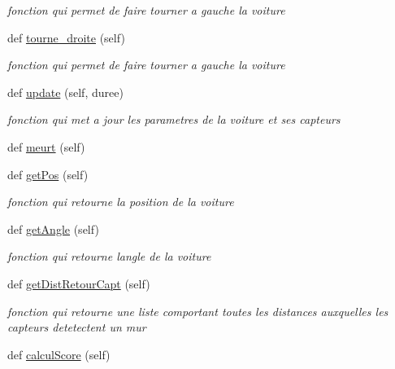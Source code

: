 \begin{DoxyCompactItemize}
\begin{DoxyCompactList}\small\item\em fonction qui permet de faire tourner a gauche la voiture \end{DoxyCompactList}\item 
def \hyperlink{classsrc_1_1_voiture_1_1voiture_1_1_voiture_ad32e5359e63f20d848ef161a6926a082}{tourne\+\_\+droite} (self)
\begin{DoxyCompactList}\small\item\em fonction qui permet de faire tourner a gauche la voiture \end{DoxyCompactList}\item 
def \hyperlink{classsrc_1_1_voiture_1_1voiture_1_1_voiture_aacae4707fab946e85c1a4599f920dd47}{update} (self, duree)
\begin{DoxyCompactList}\small\item\em fonction qui met a jour les parametres de la voiture et ses capteurs \end{DoxyCompactList}\item 
def \hyperlink{classsrc_1_1_voiture_1_1voiture_1_1_voiture_a67f1af78ea71b0d6ccfcfe272a6be4c0}{meurt} (self)
\item 
def \hyperlink{classsrc_1_1_voiture_1_1voiture_1_1_voiture_adf2c8f1fe4e59541e49ad034ebb15c99}{get\+Pos} (self)
\begin{DoxyCompactList}\small\item\em fonction qui retourne la position de la voiture \end{DoxyCompactList}\item 
def \hyperlink{classsrc_1_1_voiture_1_1voiture_1_1_voiture_a3df91fedd037cbd745bfeffb1afd2a32}{get\+Angle} (self)
\begin{DoxyCompactList}\small\item\em fonction qui retourne l\textquotesingle{}angle de la voiture \end{DoxyCompactList}\item 
def \hyperlink{classsrc_1_1_voiture_1_1voiture_1_1_voiture_afd663041ade2522f1137b38c78929f63}{get\+Dist\+Retour\+Capt} (self)
\begin{DoxyCompactList}\small\item\em fonction qui retourne une liste comportant toutes les distances auxquelles les capteurs detetectent un mur \end{DoxyCompactList}\item 
def \hyperlink{classsrc_1_1_voiture_1_1voiture_1_1_voiture_a4d2b74b448d16d053ac5908fa8598885}{calcul\+Score} (self)

\end{DoxyCompactItemize}
